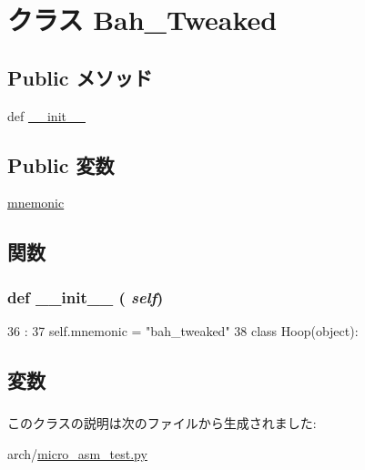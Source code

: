 \hypertarget{classmicro__asm__test_1_1Bah__Tweaked}{
\section{クラス Bah\_\-Tweaked}
\label{classmicro__asm__test_1_1Bah__Tweaked}
}
\subsection*{Public メソッド}
\begin{DoxyCompactItemize}
\item 
def \hyperlink{classmicro__asm__test_1_1Bah__Tweaked_ac775ee34451fdfa742b318538164070e}{\_\-\_\-init\_\-\_\-}
\end{DoxyCompactItemize}
\subsection*{Public 変数}
\begin{DoxyCompactItemize}
\item 
\hyperlink{classmicro__asm__test_1_1Bah__Tweaked_aaf1ad8da0f374cbd19a0a177d5280477}{mnemonic}
\end{DoxyCompactItemize}


\subsection{関数}
\hypertarget{classmicro__asm__test_1_1Bah__Tweaked_ac775ee34451fdfa742b318538164070e}{
\subsubsection[{\_\-\_\-init\_\-\_\-}]{\setlength{\rightskip}{0pt plus 5cm}def \_\-\_\-init\_\-\_\- ( {\em self})}}
\label{classmicro__asm__test_1_1Bah__Tweaked_ac775ee34451fdfa742b318538164070e}



\begin{DoxyCode}
36                       :
37         self.mnemonic = "bah_tweaked"
38 
class Hoop(object):
\end{DoxyCode}


\subsection{変数}
\hypertarget{classmicro__asm__test_1_1Bah__Tweaked_aaf1ad8da0f374cbd19a0a177d5280477}{
\subsubsection[{mnemonic}]{}}
\label{classmicro__asm__test_1_1Bah__Tweaked_aaf1ad8da0f374cbd19a0a177d5280477}


このクラスの説明は次のファイルから生成されました:\begin{DoxyCompactItemize}
\item 
arch/\hyperlink{micro__asm__test_8py}{micro\_\-asm\_\-test.py}\end{DoxyCompactItemize}
